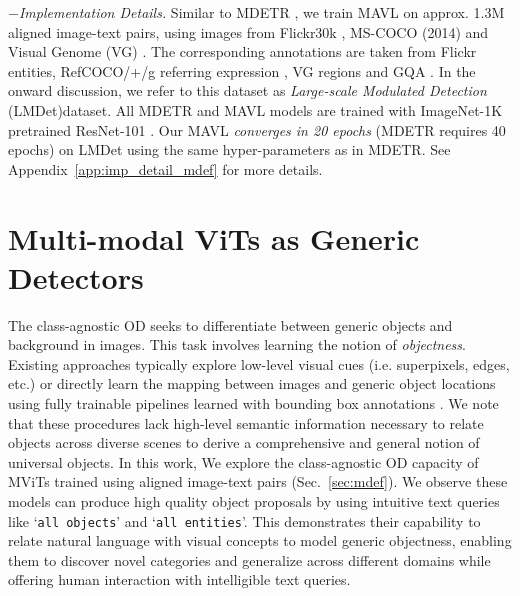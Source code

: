 \documentclass[runningheads]{llncs}
\newcommand{\txt}[1]{{\texttt{#1}}}
\begin{document}
\noindent
$-$\textit{Implementation Details.}
Similar to MDETR \cite{mdetr}, we train MAVL on approx. 1.3M aligned image-text pairs, using
images from Flickr30k \cite{plummer2015flickr30k}, MS-COCO (2014) \cite{coco} and Visual Genome (VG) \cite{krishna2017visual}. The corresponding annotations are taken from Flickr entities, RefCOCO/+/g referring expression \cite{kazemzadeh2014referitgame}, VG regions and GQA \cite{hudson2019gqa}. In the onward discussion, we refer to this dataset as \emph{Large-scale Modulated Detection} ({LMDet})dataset.
All MDETR and MAVL models are trained with ImageNet-1K \cite{russakovsky2015imagenet} pretrained ResNet-101 \cite{he2016deep}.
Our MAVL \emph{converges in 20 epochs} (MDETR requires 40 epochs) on LMDet using the same hyper-parameters as in MDETR. See Appendix~\ref{app:imp_detail_mdef} for more details.


\section{Multi-modal ViTs as Generic Detectors}\label{sec:multi-modal}
The class-agnostic OD seeks to differentiate between generic objects and background in images. This task involves learning the notion of \emph{objectness}. Existing approaches typically explore low-level visual cues
(i.e. superpixels, edges, etc.) or directly learn the mapping between images and generic object locations using fully trainable pipelines learned with bounding box annotations \cite{uijlings2013selective,zitnick2014edge,jaiswal2021class,detreg}. We note that these procedures lack high-level semantic information necessary to relate objects across diverse scenes to derive a comprehensive and general notion of universal objects. In this work, 
We explore the class-agnostic OD capacity of MViTs trained using aligned image-text pairs (Sec.~\ref{sec:mdef}).  We observe these models can produce high quality object proposals by using intuitive text queries like ‘\txt{all objects}’ and ‘\txt{all entities}’. This demonstrates  their capability to relate natural language with visual concepts to model generic objectness, enabling them to discover novel categories and generalize across different domains while offering human interaction with intelligible text queries.
\end{document}
